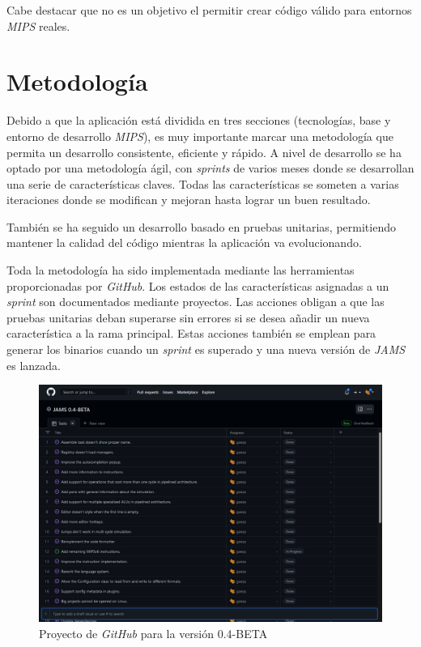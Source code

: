 \noindent Cabe destacar que no es un objetivo el permitir crear código válido para
entornos \textit{MIPS} reales.

\section{Metodología}\label{sec:metodologia}

Debido a que la aplicación está dividida en tres secciones (tecnologías, base y entorno de desarrollo \textit{MIPS}),
es muy importante marcar una metodología que permita un desarrollo consistente, eficiente y rápido.
A nivel de desarrollo se ha optado por una metodología ágil, con \textit{sprints} de varios meses
donde se desarrollan una serie de características claves.
Todas las características se someten a varias iteraciones donde se modifican y mejoran hasta lograr un
buen resultado.

\noindent También se ha seguido un desarrollo basado en pruebas unitarias,
permitiendo mantener la calidad del código mientras la aplicación va evolucionando.

\noindent Toda la metodología ha sido implementada mediante las herramientas proporcionadas por \textit{GitHub}.
Los estados de las características asignadas a un \textit{sprint} son documentados mediante proyectos.
Las acciones obligan a que las pruebas unitarias deban superarse sin errores si se desea añadir un nueva
característica a la rama principal.
Estas acciones también se emplean para generar los binarios cuando un \textit{sprint} es superado y una
nueva versión de \textit{JAMS} es lanzada.

\begin{figure}[H]
    \centering
    \includegraphics[width=\textwidth]{images/introduction/github}
    \caption{Proyecto de \textit{GitHub} para la versión 0.4-BETA}
    \label{fig:introduccion-github}
\end{figure}